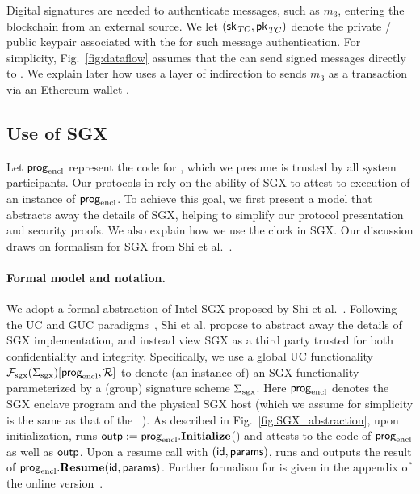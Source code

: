 Digital signatures are needed to authenticate messages, such as $m_3$, entering the blockchain from an external source. We let $({\sf sk}_{\it TC}, {\sf pk}_{\it TC})$ denote the private / public keypair associated with the \encname for such message authentication.
For simplicity, Fig.~\ref{fig:dataflow} assumes that the \encname can send signed messages directly to \tcont.
We explain later how \tc uses a layer of indirection to sends $m_3$ as a transaction via an Ethereum wallet \tcadd.


\subsection{Use of SGX}
\label{sec:useofsgx}

Let ${\sf prog}_{\textrm{encl}}$ represent the code for \encname, which we presume is trusted by all system participants.
Our protocols in \tc rely on the ability of SGX to attest to execution of an instance of ${\sf prog}_{\textrm{encl}}$.
To achieve this goal, we first present a model that abstracts away the details of SGX, helping to simplify our protocol presentation and security proofs.
We also explain how we use the clock in SGX.
Our discussion draws on formalism for SGX from Shi et al.~\cite{sgxsok}.


\paragraph{\bf Formal model and notation.} 
We adopt a formal abstraction
of Intel SGX proposed by Shi et al.~\cite{sgxsok}. %
Following the UC and GUC paradigms~\cite{uc,guc,juc}, Shi et al.
propose to 
abstract away the details of SGX implementation,
and instead view SGX
as a third party trusted
for both confidentiality and integrity.
Specifically, we use a global UC  
functionality $\mathcal{F}_{\textrm{sgx}}({\Sigma_{\textrm{sgx}}})[{\sf prog}_{\textrm{encl}}, \mathcal{R}]$
to denote (an instance of) an SGX functionality parameterized
by a (group) signature scheme ${\Sigma_{\textrm{sgx}}}$.
Here ${\sf prog}_{\textrm{encl}}$ denotes the SGX enclave program and \relay the physical
SGX host (which we assume for simplicity is the same as that of the \tc\ \medname).
As described in Fig.~\ref{fig:SGX_abstraction}, upon initialization, \fsgx runs ${\sf outp} := {\sf prog}_{\textrm{encl}}.{\bf Initialize}$()
and attests to the code of ${\sf prog}_{\textrm{encl}}$ as well as ${\sf outp}$.
Upon a resume call with ${(\sf id, params)}$, \fsgx runs and outputs the result of
${\sf prog}_{\textrm{encl}}.{\bf Resume}({\sf id, params})$.
Further formalism for \fsgx is given in the appendix of the 
online version~\cite{cryptoeprint:2016:168}.

